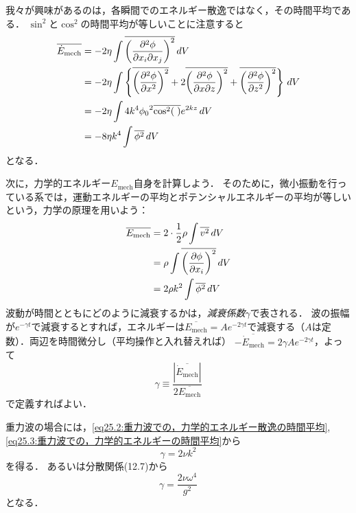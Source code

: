 我々が興味があるのは，各瞬間でのエネルギー散逸ではなく，その時間平均である．
$\sin^2$と$\cos^2$の時間平均が等しいことに注意すると
\begin{align}
    \overline{\dot{E}_\mathrm{mech}} &= -2\eta \int \overline{ \left( \pdv{\phi}{x_i}{x_j} \right)^2 } \, dV \notag \\
    &= -2\eta \int \left\{ \overline{\left(\pdv[2]{\phi}{x}\right)^2} + 2 \overline{\left(\pdv{\phi}{x}{z}\right)^2} + \overline{\left(\pdv[2]{\phi}{z}\right)^2} \right\} \, dV \notag \\
    &= -2\eta \int 4k^4 {\phi_0}^2 \overline{\cos^2(\;)} e^{2kz} \, dV \notag \\
    &= -8\eta k^4 \int \overline{\phi^2} \, dV \label{eq25.2:重力波での，力学的エネルギー散逸の時間平均}
\end{align}
となる．


次に，力学的エネルギー$E_\mathrm{mech}$自身を計算しよう．
そのために，微小振動を行っている系では，運動エネルギーの平均とポテンシャルエネルギーの平均が等しいという，力学の原理を用いよう：
\begin{align}
    \overline{E_\mathrm{mech}} &= 2 \cdot \frac{1}{2}\rho \int \overline{ v^2 } \, dV \notag \\
    &= \rho \int \overline{\left(\pdv{\phi}{x_i}\right)^2} \, dV \notag \\
    &= 2\rho k^2 \int \overline{\phi^2} \, dV \label{eq25.3:重力波での，力学的エネルギーの時間平均}
\end{align}
波動が時間とともにどのように減衰するかは，\emph{減衰係数}$\gamma$で表される．
波の振幅が$e^{-\gamma t}$で減衰するとすれば，エネルギーは$\overline{E_\mathrm{mech}} = A e^{-2\gamma t}$で減衰する（$A$は定数）．両辺を時間微分し（平均操作と入れ替えれば）
$-\overline{\dot{E}_\mathrm{mech}} = 2\gamma A e^{-2\gamma t}$，よって
\begin{equation}
    \gamma \equiv \frac{\left|\overline{\dot{E}_\mathrm{mech}}\right|}{2\overline{E_\mathrm{mech}}}
\end{equation}
で定義すればよい．


重力波の場合には，\eqref{eq25.2:重力波での，力学的エネルギー散逸の時間平均},\eqref{eq25.3:重力波での，力学的エネルギーの時間平均}から
\begin{equation}
    \gamma = 2\nu k^2
\end{equation}
を得る．
あるいは分散関係(12.7)から
\begin{equation}
    \gamma = \frac{2\nu \omega^4}{g^2}
\end{equation}
となる．


\BackToTheToc